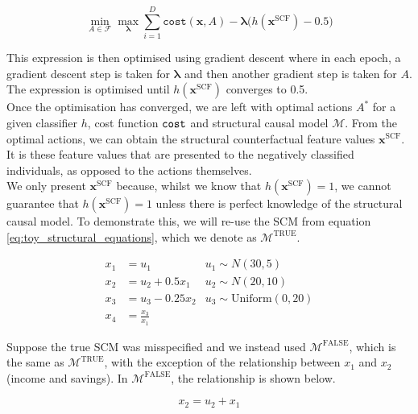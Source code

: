 \begin{equation} \label{eq:lagrange}
	\min_{A \in \mathcal{F}} \max_{\boldsymbol{\lambda}} \sum_{i=1}^D \texttt{cost}(\boldsymbol{x}, A) - \boldsymbol{\lambda} \bigg( h(\boldsymbol{x}^{\text{SCF}}) - 0.5\bigg)
\end{equation}

This expression is then optimised using gradient descent where in each epoch, a gradient descent step is taken for $\boldsymbol{\lambda}$ and then another gradient step is taken for $A$. The expression is optimised until $h(\boldsymbol{x}^{\text{SCF}})$ converges to 0.5.\\

Once the optimisation has converged, we are left with optimal actions $A^*$ for a given classifier $h$, cost function $\operatorname*{\texttt{cost}}$ and structural causal model $\mathcal{M}$. From the optimal actions, we can obtain the structural counterfactual feature values $\boldsymbol{x}^{\text{SCF}}$. It is these feature values that are presented to the negatively classified individuals, as opposed to the actions themselves.\\

We only present $\boldsymbol{x}^{\text{SCF}}$ because, whilst we know that $h(\boldsymbol{x}^{\text{SCF}})=1$, we cannot guarantee that $h(\boldsymbol{x}^{\text{SCF}})=1$ 
unless there is perfect knowledge of the structural causal model. To demonstrate this, we will re-use the SCM from equation \ref{eq:toy_structural_equations}, which we denote as $\mathcal{M}^{\text{TRUE}}$.

\begin{align}
	x_1 & = u_1 & u_1 \sim N(30 , 5) \\ \nonumber %
	x_2 & = u_2 + 0.5x_1 & u_2 \sim N(20, 10) \\ \nonumber %
	x_3 & = u_3 - 0.25x_2 & u_3 \sim \text{Uniform}(0, 20) \\ \nonumber %
	x_4 & = \frac{x_3}{x_1} %
\end{align}

Suppose the true SCM was misspecified and we instead used $\mathcal{M}^{\text{FALSE}}$, which is the same as $\mathcal{M}^{\text{TRUE}}$, with the exception of the relationship between $x_1$ and $x_2$ (income and savings). In $\mathcal{M}^{\text{FALSE}}$, the relationship is shown below.

\begin{equation}
	x_2 = u_2 + x_1
\end{equation}

